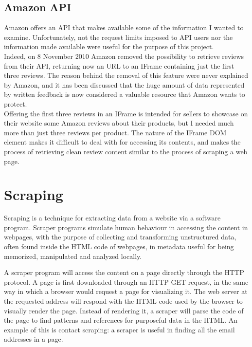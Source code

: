\documentclass[LaM,binding=0.6cm]{sapthesis}
\begin{document}
\subsection{Amazon API}
Amazon offers an API that makes available some of the information I wanted to examine. Unfortunately, not the request limits imposed to API users nor the information made available were useful for the purpose of this project. \\
Indeed, on 8 November 2010 Amazon removed the possibility to retrieve reviews from their API, returning now an URL to an IFrame containing just the first three reviews. The reason behind the removal of this feature were never explained by Amazon, and it has been discussed that the huge amount of data represented by written feedback is now considered a valuable resource that Amazon wants to protect. \\
Offering the first three reviews in an IFrame is intended for sellers to showcase on their website some Amazon reviews about their products, but I needed much more than just three reviews per product. The nature of the IFrame DOM element makes it difficult to deal with for accessing its contents, and makes the process of retrieving clean review content similar to the process of scraping a web page. \\


\section{Scraping}

Scraping is a technique for extracting data from a website via a software program. Scraper programs simulate human behaviour in accessing the content in webpages, with the purpose of collecting and transforming unstructured data, often found inside the HTML code of webpages, in metadata useful for being memorized, manipulated and analyzed locally.

A scraper program will access the content on a page directly through the HTTP protocol. A page is first downloaded through an HTTP GET request, in the same way in which a browser would request a page for visualizing it. The web server at the requested address will respond with the HTML code used by the browser to visually render the page. Instead of rendering it, a scraper will parse the code of the page to find patterns and references for purposeful data in the HTML. An example of this is contact scraping: a scraper is useful in finding all the email addresses in a page.
\end{document}

